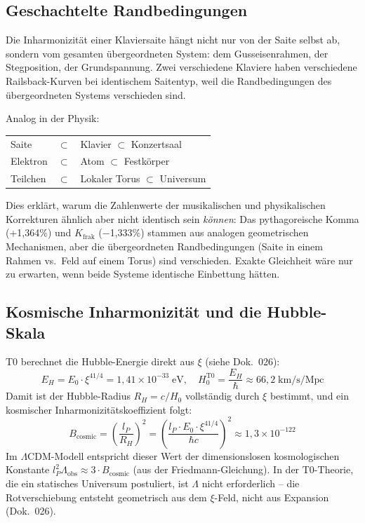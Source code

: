 \subsection{Geschachtelte Randbedingungen}

Die Inharmonizität einer Klaviersaite hängt nicht nur von der Saite selbst ab, sondern vom gesamten übergeordneten System: dem Gusseisenrahmen, der Stegposition, der Grundspannung. Zwei verschiedene Klaviere haben verschiedene Railsback-Kurven bei identischem Saitentyp, weil die Randbedingungen des übergeordneten Systems verschieden sind.

Analog in der Physik:
\begin{center}
\begin{tabular}{lcl}
	Saite & $\subset$ & Klavier $\subset$ Konzertsaal\\
	Elektron & $\subset$ & Atom $\subset$ Festkörper\\
	Teilchen & $\subset$ & Lokaler Torus $\subset$ Universum
\end{tabular}
\end{center}

Dies erklärt, warum die Zahlenwerte der musikalischen und physikalischen Korrekturen ähnlich aber nicht identisch sein \emph{können}: Das pythagoreische Komma (+1,364\%) und $K_\text{frak}$ ($-$1,333\%) stammen aus analogen geometrischen Mechanismen, aber die übergeordneten Randbedingungen (Saite in einem Rahmen vs.\ Feld auf einem Torus) sind verschieden. Exakte Gleichheit wäre nur zu erwarten, wenn beide Systeme identische Einbettung hätten.

\subsection{Kosmische Inharmonizität und die Hubble-Skala}

T0 berechnet die Hubble-Energie direkt aus $\xi$ (siehe Dok.~026):
\begin{equation}
	E_H = E_0 \cdot \xi^{41/4} = 1{,}41 \times 10^{-33}\;\text{eV}, \quad H_0^{\text{T0}} = \frac{E_H}{\hbar} \approx 66{,}2\;\text{km/s/Mpc}
\end{equation}
Damit ist der Hubble-Radius $R_H = c/H_0$ vollständig durch $\xi$ bestimmt, und ein kosmischer Inharmonizitätskoeffizient folgt:
\begin{equation}
	B_\text{cosmic} = \left(\frac{l_P}{R_H}\right)^2 = \left(\frac{l_P \cdot E_0 \cdot \xi^{41/4}}{\hbar c}\right)^2 \approx 1{,}3 \times 10^{-122}
\end{equation}
Im $\Lambda$CDM-Modell entspricht dieser Wert der dimensionslosen kosmologischen Konstante $l_P^2 \Lambda_\text{obs} \approx 3 \cdot B_\text{cosmic}$ (aus der Friedmann-Gleichung). In der T0-Theorie, die ein statisches Universum postuliert, ist $\Lambda$ nicht erforderlich -- die Rotverschiebung entsteht geometrisch aus dem $\xi$-Feld, nicht aus Expansion (Dok.~026).

